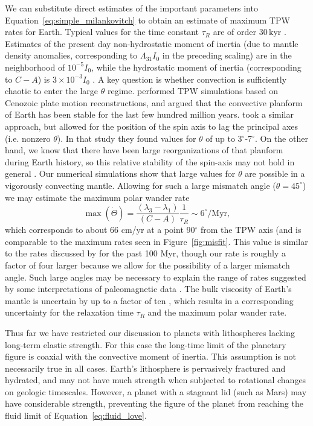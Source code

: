 \documentclass[preprint,12pt,authoryear]{elsarticle}
\begin{document}
We can substitute direct estimates of the important parameters into Equation~\eqref{eq:simple_milankovitch} to obtain an estimate of maximum TPW rates for Earth.
Typical values for the time constant $\tau_R$ are of order $30 \, \mathrm{kyr}$ \citep{ricard1993polar}.
Estimates of the present day non-hydrostatic moment of inertia (due to mantle density anomalies, corresponding to $\Lambda_{31}I_0$ in the preceding scaling)
are in the neighborhood of $10^{-5} I_0$, while the hydrostatic moment of inertia (corresponding to $C-A$) is $3 \times 10^{-3} I_0$ \citep{chambat2001mean}.
A key question is whether convection is sufficiently chaotic to enter the large $\theta$ regime. 
\citet{richards1997explanation} performed TPW simulations based on Cenozoic plate motion reconstructions, and argued that the convective planform of Earth has been stable for the last few hundred million years. 
\citet{cambiotti2011new} took a similar approach, but allowed for the position of the spin axis to lag the principal axes (i.e. nonzero $\theta$). In that study they found values for $\theta$ of up to 3$^\circ$-7$^\circ$.
On the other hand, we know that there have been large reorganizations of that planform during Earth history,
so this relative stability of the spin-axis may not hold in general \citep{evans2003true}.
Our numerical simulations show that large values for $\theta$ are possible in a vigorously convecting mantle.
Allowing for such a large mismatch angle ($\theta = 45^\circ$) we may estimate the maximum polar wander rate
\begin{equation}
\max ( \dot{\Theta} ) = \frac{(\lambda_3-\lambda_1)}{(C-A)}\frac{1}{\tau_R} \sim 6^\circ / \mathrm{Myr},
\end{equation}
which corresponds to about 66 cm/yr at a point 90$^\circ$ from the TPW axis (and is comparable to the maximum rates seen in Figure~\ref{fig:misfit}.
This value is similar to the rates discussed by \citet{cambiotti2011new} for the past 100 Myr, though our rate is roughly a factor of four larger because we allow for the
possibility of a larger mismatch angle. Such large angles may be necessary to explain the range of rates suggested by some interpretations of paleomagnetic data \citep{mitchell2011sutton}.
The bulk viscosity of Earth's mantle is uncertain by up to a factor of ten \citep{mitrovica2004new},
which results in a corresponding uncertainty for the relaxation time $\tau_R$ and the maximum polar wander rate.

Thus far we have restricted our discussion to planets with lithospheres lacking long-term elastic strength.
For this case the long-time limit of the planetary figure is coaxial with the convective 
moment of inertia. This assumption is not necessarily true in all cases.
Earth's lithosphere is pervasively fractured and hydrated, and may not have much strength when subjected to rotational changes on geologic timescales.
However, a planet with a stagnant lid (such as Mars) may have considerable strength, preventing the figure of the planet 
from reaching the fluid limit of Equation~\eqref{eq:fluid_love}.
\end{document}
